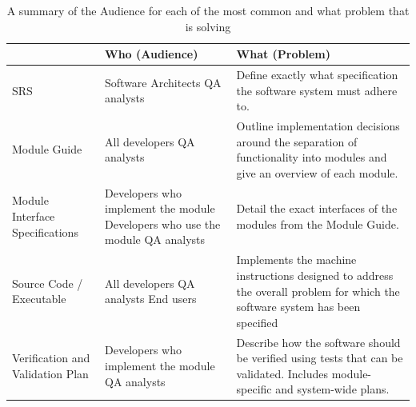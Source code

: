\begin{table}[h!]
\caption{A summary of the Audience for each of the most common \sfs{} and what 
problem that \sf{} is solving}
\label{tab:sfsummary}
\begin{tabular}{| P{.3\linewidth} | p{.3\linewidth}  | p{.3\linewidth} |}
\hline
 \SF{} & Who (Audience) & What (Problem)
\\ \hline
	SRS & 

	Software Architects \newline \newline
	QA analysts & 

	Define exactly what specification the software system must adhere to. 
\\ \hline
	Module Guide & 

	All developers \newline \newline
	QA analysts  & 

	Outline implementation decisions around the separation of functionality 
	into modules and give an overview of each module.
\\ \hline
	Module Interface Specifications & 

	Developers who implement the module \newline \newline
	Developers who use the module \newline \newline
	QA analysts & 

	Detail the exact interfaces of the modules from the Module Guide.
\\ \hline
	Source Code / Executable &
	
	All developers \newline \newline
	QA analysts \newline \newline 
	End users &

	Implements the machine instructions designed to address the overall problem 
	for which the software system has been specified
\\ \hline
	Verification and Validation Plan &
	
	Developers who implement the module \newline \newline
	QA analysts &

	Describe how the software should be verified using tests that can be 
	validated. Includes module-specific and system-wide plans.
\\ \hline
\end{tabular}
\end{table}

